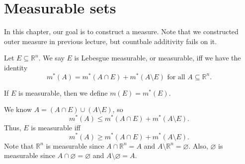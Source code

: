 \section{Measurable sets}
In this chapter, our goal is to construct a measure. Note that we constructed outer measure in previous lecture, but countbale additivity fails on it. 

\begin{definition}
    Let \(E \subseteq \mathbb{R} ^n\). We say \(E\) is Lebesgue measurable, or measurable, iff we have the identity 
    \[
        m^*(A) = m^*(A \cap E) + m^*(A \setminus E) \text{ for all } A \subseteq \mathbb{R} ^n. 
    \]  
\end{definition}

\begin{notation}
    If \(E\) is measurable, then we define \(m(E) = m^*(E)\).  
\end{notation}

\begin{remark}
    We know \(A = (A \cap E) \cup (A \setminus E)\), so 
    \[
        m^*(A) \le m^*(A \cap E) + m^*(A \setminus E).
    \] 
    Thus, \(E\) is measurable iff 
    \[
        m^*(A) \ge m^*(A \cap E) + m^*(A \setminus E).
    \] 
    Note that \(\mathbb{R} ^n\) is measurable since \(A \cap \mathbb{R} ^n = A\) and \(A \setminus \mathbb{R} ^n = \varnothing\). Also, \(\varnothing\) is measurable since \(A \cap \varnothing = \varnothing\) and \(A \setminus \varnothing = A\).      
\end{remark}

